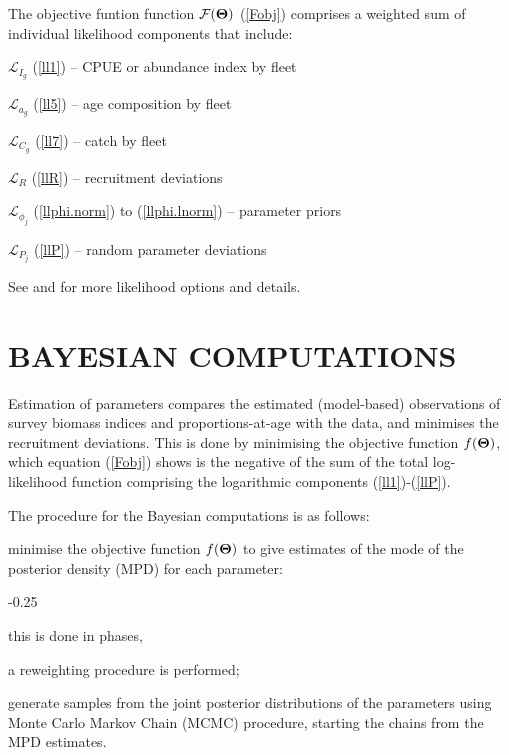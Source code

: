 \documentclass[11pt]{book}
\newcommand{\Lagr}{\mathcal{L}}%
\newcommand{\Fobj}{\mathcal{F}}%
\def\bfTh{{\bf \Theta}}%
\def\bfTh{{\bf \Theta}}          %
\newcommand{\eref}[1]{(\ref{#1})}
\begin{document}
The objective funtion function $\Fobj(\bfTh)$ \eref{Fobj} comprises a weighted sum of individual likelihood components that include:
\begin{itemize_csas}{}{}
  \item $\Lagr_{I_g}$ \eref{ll1} -- CPUE or abundance index by fleet
  \item $\Lagr_{a_g}$ \eref{ll5} -- age composition by fleet
  \item $\Lagr_{C_g}$ \eref{ll7} -- catch by fleet
  \item $\Lagr_{R}$ \eref{llR}   --  recruitment deviations
  \item $\Lagr_{\phi_j}$ \eref{llphi.norm} to \eref{llphi.lnorm} -- parameter priors
  \item $\Lagr_{P_j}$ \eref{llP} -- random parameter deviations
\end{itemize_csas}
See \citet{Methot-Wetzel:2013} and \citet{Methot-etal:2021} for more likelihood options and details.

\section{BAYESIAN COMPUTATIONS}

Estimation of parameters compares the estimated (model-based) observations of survey biomass indices and proportions-at-age with the data, and minimises the recruitment deviations. 
This is done by minimising the objective function $f(\bfTh)$, which equation \eref{Fobj} shows is the negative of the sum of the total log-likelihood function comprising the logarithmic components \eref{ll1}-\eref{llP}.

The procedure for the Bayesian computations is as follows:
\begin{enumerate_csas}{}{}
  \item minimise the objective function $f(\bfTh)$ to give estimates of the mode of the posterior density (MPD) for each parameter:
  \begin{enumerate_csas}{-0.25}{}
    \item this is done in phases,
    \item a reweighting procedure is performed;
  \end{enumerate_csas}
  \item generate samples from the joint posterior distributions of the parameters using Monte Carlo Markov Chain (MCMC) procedure, starting the chains from the MPD estimates.
\end{enumerate_csas}
\end{document}
